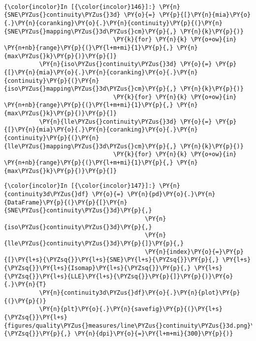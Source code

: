     \begin{center}
    \end{center}
    { \hspace*{\fill} \\}

    \begin{Verbatim}[commandchars=\\\{\}]
{\color{incolor}In [{\color{incolor}146}]:} \PY{n}{SNE\PYZus{}continuity\PYZus{}3d} \PY{o}{=} \PY{p}{[}\PY{n}{mia}\PY{o}{.}\PY{n}{coranking}\PY{o}{.}\PY{n}{continuity}\PY{p}{(}\PY{n}{SNE\PYZus{}mapping\PYZus{}3d\PYZus{}cm}\PY{p}{,} \PY{n}{k}\PY{p}{)}
                               \PY{k}{for} \PY{n}{k} \PY{o+ow}{in} \PY{n+nb}{range}\PY{p}{(}\PY{l+m+mi}{1}\PY{p}{,} \PY{n}{max\PYZus{}k}\PY{p}{)}\PY{p}{]}
          \PY{n}{iso\PYZus{}continuity\PYZus{}3d} \PY{o}{=} \PY{p}{[}\PY{n}{mia}\PY{o}{.}\PY{n}{coranking}\PY{o}{.}\PY{n}{continuity}\PY{p}{(}\PY{n}{iso\PYZus{}mapping\PYZus{}3d\PYZus{}cm}\PY{p}{,} \PY{n}{k}\PY{p}{)}
                               \PY{k}{for} \PY{n}{k} \PY{o+ow}{in} \PY{n+nb}{range}\PY{p}{(}\PY{l+m+mi}{1}\PY{p}{,} \PY{n}{max\PYZus{}k}\PY{p}{)}\PY{p}{]}
          \PY{n}{lle\PYZus{}continuity\PYZus{}3d} \PY{o}{=} \PY{p}{[}\PY{n}{mia}\PY{o}{.}\PY{n}{coranking}\PY{o}{.}\PY{n}{continuity}\PY{p}{(}\PY{n}{lle\PYZus{}mapping\PYZus{}3d\PYZus{}cm}\PY{p}{,} \PY{n}{k}\PY{p}{)}
                               \PY{k}{for} \PY{n}{k} \PY{o+ow}{in} \PY{n+nb}{range}\PY{p}{(}\PY{l+m+mi}{1}\PY{p}{,} \PY{n}{max\PYZus{}k}\PY{p}{)}\PY{p}{]}
\end{Verbatim}

    \begin{Verbatim}[commandchars=\\\{\}]
{\color{incolor}In [{\color{incolor}147}]:} \PY{n}{continuity3d\PYZus{}df} \PY{o}{=} \PY{n}{pd}\PY{o}{.}\PY{n}{DataFrame}\PY{p}{(}\PY{p}{[}\PY{n}{SNE\PYZus{}continuity\PYZus{}3d}\PY{p}{,}
                                        \PY{n}{iso\PYZus{}continuity\PYZus{}3d}\PY{p}{,}
                                        \PY{n}{lle\PYZus{}continuity\PYZus{}3d}\PY{p}{]}\PY{p}{,}
                                        \PY{n}{index}\PY{o}{=}\PY{p}{[}\PY{l+s}{\PYZsq{}}\PY{l+s}{SNE}\PY{l+s}{\PYZsq{}}\PY{p}{,} \PY{l+s}{\PYZsq{}}\PY{l+s}{Isomap}\PY{l+s}{\PYZsq{}}\PY{p}{,} \PY{l+s}{\PYZsq{}}\PY{l+s}{LLE}\PY{l+s}{\PYZsq{}}\PY{p}{]}\PY{p}{)}\PY{o}{.}\PY{n}{T}
          \PY{n}{continuity3d\PYZus{}df}\PY{o}{.}\PY{n}{plot}\PY{p}{(}\PY{p}{)}
          \PY{n}{plt}\PY{o}{.}\PY{n}{savefig}\PY{p}{(}\PY{l+s}{\PYZsq{}}\PY{l+s}{figures/quality\PYZus{}measures/line\PYZus{}continuity\PYZus{}3d.png}\PY{l+s}{\PYZsq{}}\PY{p}{,} \PY{n}{dpi}\PY{o}{=}\PY{l+m+mi}{300}\PY{p}{)}
\end{Verbatim}

